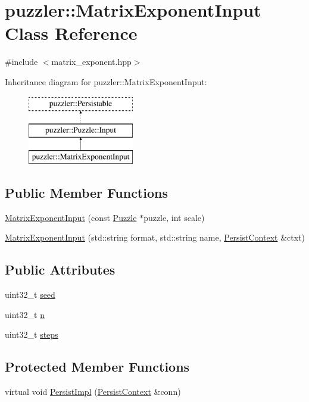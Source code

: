 \hypertarget{a00015}{}\section{puzzler\+:\+:Matrix\+Exponent\+Input Class Reference}
\label{a00015}


{\ttfamily \#include $<$matrix\+\_\+exponent.\+hpp$>$}

Inheritance diagram for puzzler\+:\+:Matrix\+Exponent\+Input\+:\begin{figure}[H]
\begin{center}
\leavevmode
\includegraphics[height=3.000000cm]{a00015}
\end{center}
\end{figure}
\subsection*{Public Member Functions}
\begin{DoxyCompactItemize}
\item 
\hyperlink{a00015_afd8c1ea7397f158b550b448638698378}{Matrix\+Exponent\+Input} (const \hyperlink{a00026}{Puzzle} $\ast$puzzle, int scale)
\item 
\hyperlink{a00015_ad0e5bb79e077688967378234bf635cd3}{Matrix\+Exponent\+Input} (std\+::string format, std\+::string name, \hyperlink{a00025}{Persist\+Context} \&ctxt)
\end{DoxyCompactItemize}
\subsection*{Public Attributes}
\begin{DoxyCompactItemize}
\item 
uint32\+\_\+t \hyperlink{a00015_a9214343038a67f5edcdd0c8fd05b4696}{seed}
\item 
uint32\+\_\+t \hyperlink{a00015_a3e65b220b8552a93c2ec0ab976d46659}{n}
\item 
uint32\+\_\+t \hyperlink{a00015_aaf0ed0e65e4de2cd3b86532463c8f707}{steps}
\end{DoxyCompactItemize}
\subsection*{Protected Member Functions}
\begin{DoxyCompactItemize}
\item 
virtual void \hyperlink{a00015_a589d72c775cc8dd4d33732bbaab5ed01}{Persist\+Impl} (\hyperlink{a00025}{Persist\+Context} \&conn)
\end{DoxyCompactItemize}


